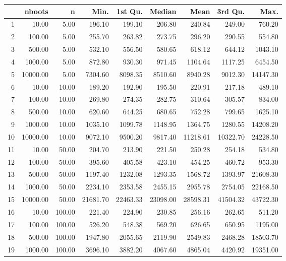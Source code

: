 \begin{table}[ht]
\centering
\begin{tabular}{rrrrrrrrr}
  \hline
 & nboots & n & Min. & 1st Qu. & Median & Mean & 3rd Qu. & Max. \\ 
  \hline
1 & 10.00 & 5.00 & 196.10 & 199.10 & 206.80 & 240.84 & 249.00 & 760.20 \\ 
  2 & 100.00 & 5.00 & 255.70 & 263.82 & 273.75 & 296.20 & 290.55 & 554.80 \\ 
  3 & 500.00 & 5.00 & 532.10 & 556.50 & 580.65 & 618.12 & 644.12 & 1043.10 \\ 
  4 & 1000.00 & 5.00 & 872.80 & 930.30 & 971.45 & 1104.64 & 1117.25 & 6454.50 \\ 
  5 & 10000.00 & 5.00 & 7304.60 & 8098.35 & 8510.60 & 8940.28 & 9012.30 & 14147.30 \\ 
  6 & 10.00 & 10.00 & 189.20 & 192.90 & 195.50 & 220.91 & 217.18 & 489.10 \\ 
  7 & 100.00 & 10.00 & 269.80 & 274.35 & 282.75 & 310.64 & 305.57 & 834.00 \\ 
  8 & 500.00 & 10.00 & 620.60 & 644.25 & 680.65 & 752.28 & 799.65 & 1625.10 \\ 
  9 & 1000.00 & 10.00 & 1035.10 & 1099.78 & 1148.95 & 1364.75 & 1280.55 & 14208.20 \\ 
  10 & 10000.00 & 10.00 & 9072.10 & 9500.20 & 9817.40 & 11218.61 & 10322.70 & 24228.50 \\ 
  11 & 10.00 & 50.00 & 204.70 & 213.90 & 221.50 & 250.28 & 254.18 & 534.80 \\ 
  12 & 100.00 & 50.00 & 395.60 & 405.58 & 423.10 & 454.25 & 460.72 & 953.30 \\ 
  13 & 500.00 & 50.00 & 1197.40 & 1232.08 & 1293.35 & 1568.72 & 1393.97 & 21608.30 \\ 
  14 & 1000.00 & 50.00 & 2234.10 & 2353.58 & 2455.15 & 2955.78 & 2754.05 & 22168.50 \\ 
  15 & 10000.00 & 50.00 & 21681.70 & 22463.33 & 23098.00 & 28598.31 & 41504.32 & 43722.30 \\ 
  16 & 10.00 & 100.00 & 221.40 & 224.90 & 230.85 & 256.16 & 262.65 & 511.20 \\ 
  17 & 100.00 & 100.00 & 526.20 & 548.38 & 569.20 & 626.65 & 650.95 & 1195.00 \\ 
  18 & 500.00 & 100.00 & 1947.80 & 2055.65 & 2119.90 & 2549.83 & 2468.28 & 18503.70 \\ 
  19 & 1000.00 & 100.00 & 3696.10 & 3882.20 & 4067.60 & 4865.04 & 4420.92 & 19351.00 \\ 

\end{tabular}
\end{table}
